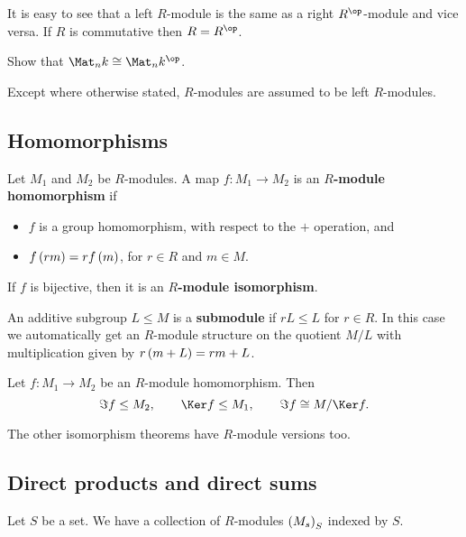It is easy to see that a left $ R $-module is the same as a right $ R^{\op} $-module and vice versa. If $ R $ is commutative then $ R = R^{\op} $.

\begin{exercise*}
Show that $ \Mat_n k \cong \Mat_n k^{\op} $.
\end{exercise*}

Except where otherwise stated, $ R $-modules are assumed to be left $ R $-modules.

\pagebreak

\subsection{Homomorphisms}

\begin{definition}
Let $ M_1 $ and $ M_2 $ be $ R $-modules. A map $ f : M_1 \to M_2 $ is an \textbf{$ R $-module homomorphism} if
\begin{itemize}
\item $ f $ is a group homomorphism, with respect to the $ + $ operation, and
\item $ f\br{rm} = rf\br{m} $, for $ r \in R $ and $ m \in M $.
\end{itemize}
If $ f $ is bijective, then it is an \textbf{$ R $-module isomorphism}.
\end{definition}

\begin{definition}
An additive subgroup $ L \le M $ is a \textbf{submodule} if $ rL \le L $ for $ r \in R $. In this case we automatically get an $ R $-module structure on the quotient $ M / L $ with multiplication given by $ r\br{m + L} = rm + L $.
\end{definition}

\begin{theorem}
Let $ f : M_1 \to M_2 $ be an $ R $-module homomorphism. Then
$$ \Im f \le M_2, \qquad \Ker f \le M_1, \qquad \Im f \cong M / \Ker f. $$
\end{theorem}

The other isomorphism theorems have $ R $-module versions too.

\subsection{Direct products and direct sums}


Let $ S $ be a set. We have a collection of $ R $-modules $ \br{M_s}_S $ indexed by $ S $.

